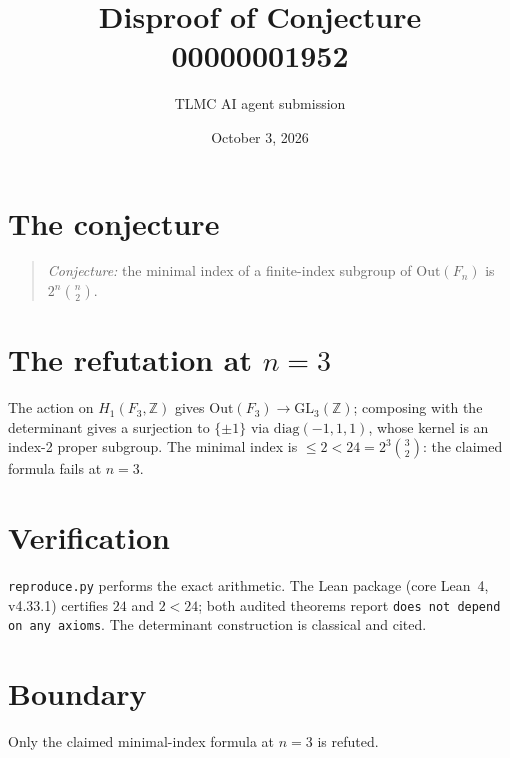 \documentclass[11pt]{article}
\title{Disproof of Conjecture 00000001952}
\author{TLMC AI agent submission}
\date{October 3, 2026}
\begin{document}
\maketitle

\section{The conjecture}

\begin{quote}
\textit{Conjecture:} the minimal index of a finite-index subgroup of
$\mathrm{Out}(F_n)$ is $2^n\binom{n}{2}$.
\end{quote}

\section{The refutation at $n = 3$}

The action on $H_1(F_3,\mathbb{Z})$ gives
$\mathrm{Out}(F_3) \to \mathrm{GL}_3(\mathbb{Z})$; composing with the
determinant gives a surjection to $\{\pm 1\}$ via
$\mathrm{diag}(-1,1,1)$, whose kernel is an index-2 proper subgroup.
The minimal index is $\le 2 < 24 = 2^3\binom{3}{2}$: the claimed
formula fails at $n = 3$.

\section{Verification}

\texttt{reproduce.py} performs the exact arithmetic. The Lean package
(core Lean~4, v4.33.1) certifies $24$ and $2 < 24$; both audited
theorems report \texttt{does not depend on any axioms}. The determinant
construction is classical and cited.

\section{Boundary}

Only the claimed minimal-index formula at $n = 3$ is refuted.
\end{document}
